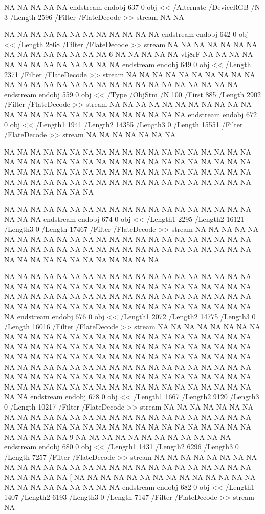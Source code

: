 {NA
NA
NA
NA
NA
endstream
endobj
637 0 obj
<<
/Alternate /DeviceRGB
/N 3
/Length 2596
/Filter /FlateDecode
>>
stream
NA
NA

NA
NA
NA
NA
NA
NA
NA
NA
NA
NA
NA
NA
endstream
endobj
642 0 obj <<
/Length 2868      
/Filter /FlateDecode
>>
stream
NA
NA
NA
NA
NA
NA
NA
NA
NA
NA
NA
NA
NA
NA
NA
6
NA
NA
NA
NA
NA
vIj8rF
NA
NA
NA
NA
NA
NA
NA
NA
NA
NA
NA
NA
NA
endstream
endobj
649 0 obj <<
/Length 2371      
/Filter /FlateDecode
>>
stream
NA
NA
NA
NA
NA
NA
NA
NA
NA
NA
NA
NA
NA
NA
NA
NA
NA
NA
NA
NA
NA
NA
NA
NA
NA
NA
NA
NA
endstream
endobj
559 0 obj <<
/Type /ObjStm
/N 100
/First 885
/Length 2902      
/Filter /FlateDecode
>>
stream
NA
NA
NA
NA
NA
NA
NA
NA
NA
NA
NA
NA
NA
NA
NA
NA
NA
NA
NA
NA
NA
NA
NA
NA
NA
endstream
endobj
672 0 obj <<
/Length1 1941
/Length2 14355
/Length3 0
/Length 15551     
/Filter /FlateDecode
>>
stream
NA
NA
NA
NA
NA
NA
NA

NA
NA
NA
NA
NA
NA
NA
NA
NA
NA
NA
NA
NA
NA
NA
NA
NA
NA
NA
NA
NA
NA
NA
NA
NA
NA
NA
NA
NA
NA
NA
NA
NA
NA
NA
NA
NA
NA
NA
NA
NA
NA
NA
NA
NA
NA
NA
NA
NA
NA
NA
NA
NA
NA
NA
NA
NA
NA
NA
NA
NA
NA
NA
NA
NA
NA
NA
NA
NA
NA
NA
NA
NA
NA
NA
NA
NA
NA
NA
NA
NA
NA
NA

NA
NA
NA
NA
NA
NA
NA
NA
NA
NA
NA
NA
NA
NA
NA
NA
NA
NA
NA
NA
NA
NA
endstream
endobj
674 0 obj <<
/Length1 2295
/Length2 16121
/Length3 0
/Length 17467     
/Filter /FlateDecode
>>
stream
NA
NA
NA
NA
NA
NA
NA
NA
NA
NA
NA
NA
NA
NA
NA
NA
NA
NA
NA
NA
NA
NA
NA
NA
NA
NA
NA
NA
NA
NA
NA
NA
NA
NA
NA
NA
NA
NA
NA
NA
NA
NA
NA
NA
NA
NA
NA
NA
NA
NA
NA
NA
NA
NA
NA

NA
NA
NA
NA
NA
NA
NA
NA
NA
NA
NA
NA
NA
NA
NA
NA
NA
NA
NA
NA
NA
NA
NA
NA
NA
NA
NA
NA
NA
NA
NA
NA
NA
NA
NA
NA
NA
NA
NA
NA
NA
NA
NA
NA
NA
NA
NA
NA
NA
NA
NA
NA
NA
NA
NA
NA
NA
NA
NA
NA
NA
NA
NA
NA
NA
NA
NA
NA
NA
NA
NA
NA
NA
NA
NA
NA
NA
endstream
endobj
676 0 obj <<
/Length1 2072
/Length2 14775
/Length3 0
/Length 16016     
/Filter /FlateDecode
>>
stream
NA
NA
NA
NA
NA
NA
NA
NA
NA
NA
NA
NA
NA
NA
NA
NA
NA
NA
NA
NA
NA
NA
NA
NA
NA
NA
NA
NA
NA
NA
NA
NA
NA
NA
NA
NA
NA
NA
NA
NA
NA
NA
NA
NA
NA
NA
NA
NA
NA
NA
NA
NA
NA
NA
NA
NA
NA
NA
NA
NA
NA
NA
NA
NA
NA
NA
NA
NA
NA
NA
NA
NA
NA
NA
NA
NA
NA
NA
NA
NA
NA
NA
NA
NA
NA
NA
NA
NA
NA
NA
NA
NA
NA
NA
NA
NA
NA
NA
NA
NA
NA
NA
NA
NA
NA
NA
NA
NA
NA
NA
NA
NA
NA
NA
NA
NA
NA
NA
NA
NA
NA
NA
NA
NA
endstream
endobj
678 0 obj <<
/Length1 1667
/Length2 9120
/Length3 0
/Length 10217     
/Filter /FlateDecode
>>
stream
NA
NA
NA
NA
NA
NA
NA
NA
NA
NA
NA
NA
NA
NA
NA
NA
NA
NA
NA
NA
NA
NA
NA
NA
NA
NA
NA
NA
NA
NA
NA
NA
NA
NA
NA
NA
NA
NA
NA
NA
NA
NA
NA
NA
NA
NA
NA
NA
NA
NA
9
NA
NA
NA
NA
NA
NA
NA
NA
NA
NA
NA
NA
endstream
endobj
680 0 obj <<
/Length1 1431
/Length2 6296
/Length3 0
/Length 7257      
/Filter /FlateDecode
>>
stream
NA
NA
NA
NA
NA
NA
NA
NA
NA
NA
NA
NA
NA
NA
NA
NA
NA
NA
NA
NA
NA
NA
NA
NA
NA
NA
NA
NA
NA
NA
NA
NA
[
NA
NA
NA
NA
NA
NA
NA
NA
NA
NA
NA
NA
NA
NA
NA
NA
NA
NA
NA
NA
NA
NA
NA
endstream
endobj
682 0 obj <<
/Length1 1407
/Length2 6193
/Length3 0
/Length 7147      
/Filter /FlateDecode
>>
stream
NA

}
